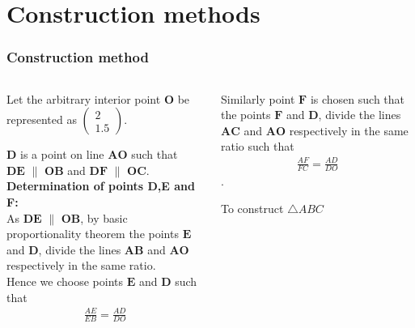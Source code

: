 \documentclass{beamer}
\renewcommand{\vec}[1]{\mathbf{#1}}
\begin{document}
\section*{Construction methods}
\begin{frame}[fragile]
\footnotesize
\frametitle{Construction method}
\begin{columns}
\begin{column}{0.5\textwidth}
      Let the arbitrary interior point $\vec{O}$ be represented as $\begin{pmatrix}2\\1.5\end{pmatrix}$.\quad

    $\vec{D}$ is a point on line $\vec{AO}$ such that \\$\vec{DE}$ $\parallel$ $\vec{OB}$ \quad and \quad $\vec{DF}$  $\parallel$  $\vec{OC}$.\\

\textbf{Determination of points D,E and F:}\\

As $\vec{DE}$ $\parallel$ $\vec{OB}$, by basic proportionality theorem the points $\vec{E}$ and $\vec{D}$, divide the lines $\vec{AB}$ and $\vec{AO}$ respectively in the same ratio.\\ 
Hence we choose points $\vec{E}$ and $\vec{D}$ such that \begin{align}\frac{AE}{EB} = \frac{AD}{DO}\end{align} 

  \end{column}
 
 
\begin{column}{0.5\textwidth}   
\quad Similarly point $\vec{F}$ is chosen such that the points $\vec{F}$ and $\vec{D}$, divide the lines $\vec{AC}$ and $\vec{AO}$ respectively in the same ratio such that \begin{align}\frac{AF}{FC} = \frac{AD}{DO}\end{align}.\\
  

\begin{table}[ht]
    \begin{center}
    
    \caption{To construct $\triangle ABC$}
   \label{table:table2}
   \end{center}	
\end{table}

 
    
\end{column}
\end{columns}
\end{frame}
\end{document}
